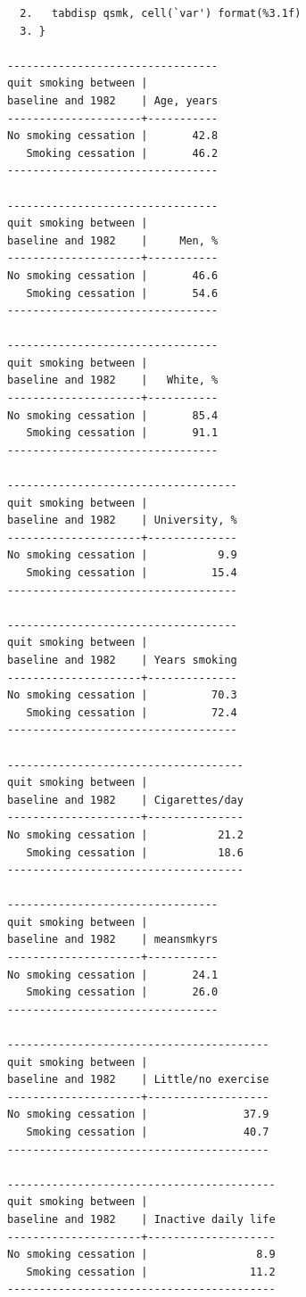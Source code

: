\documentclass[
  10pt,
  a4paper,
]{book}
\begin{document}
\begin{verbatim}
  2.   tabdisp qsmk, cell(`var') format(%3.1f)
  3. }

---------------------------------
quit smoking between |
baseline and 1982    | Age, years
---------------------+-----------
No smoking cessation |       42.8
   Smoking cessation |       46.2
---------------------------------

---------------------------------
quit smoking between |
baseline and 1982    |     Men, %
---------------------+-----------
No smoking cessation |       46.6
   Smoking cessation |       54.6
---------------------------------

---------------------------------
quit smoking between |
baseline and 1982    |   White, %
---------------------+-----------
No smoking cessation |       85.4
   Smoking cessation |       91.1
---------------------------------

------------------------------------
quit smoking between |
baseline and 1982    | University, %
---------------------+--------------
No smoking cessation |           9.9
   Smoking cessation |          15.4
------------------------------------

------------------------------------
quit smoking between |
baseline and 1982    | Years smoking
---------------------+--------------
No smoking cessation |          70.3
   Smoking cessation |          72.4
------------------------------------

-------------------------------------
quit smoking between |
baseline and 1982    | Cigarettes/day
---------------------+---------------
No smoking cessation |           21.2
   Smoking cessation |           18.6
-------------------------------------

---------------------------------
quit smoking between |
baseline and 1982    | meansmkyrs
---------------------+-----------
No smoking cessation |       24.1
   Smoking cessation |       26.0
---------------------------------

-----------------------------------------
quit smoking between |
baseline and 1982    | Little/no exercise
---------------------+-------------------
No smoking cessation |               37.9
   Smoking cessation |               40.7
-----------------------------------------

------------------------------------------
quit smoking between |
baseline and 1982    | Inactive daily life
---------------------+--------------------
No smoking cessation |                 8.9
   Smoking cessation |                11.2
------------------------------------------
\end{verbatim}
\end{document}
